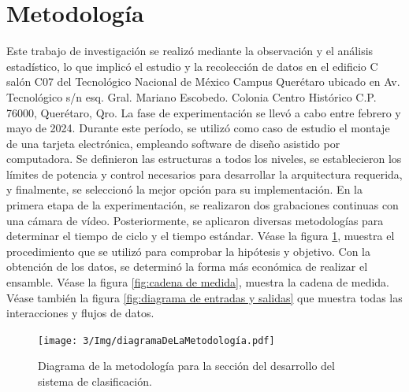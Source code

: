     \section{Metodología}
    
    Este trabajo de investigación se realizó mediante la observación y el análisis estadístico, lo que implicó el estudio y la recolección de datos en el edificio C salón C07 del Tecnológico Nacional de México Campus Querétaro ubicado en Av. Tecnológico s/n esq. Gral. Mariano Escobedo. Colonia Centro Histórico C.P. 76000, Querétaro, Qro. La fase de experimentación se llevó a cabo entre febrero y mayo de 2024. Durante este período, se utilizó como caso de estudio el montaje de una tarjeta electrónica, empleando software de diseño asistido por computadora. Se definieron las estructuras a todos los niveles, se establecieron los límites de potencia y control necesarios para desarrollar la arquitectura requerida, y finalmente, se seleccionó la mejor opción para su implementación. En la primera etapa de la experimentación, se realizaron dos grabaciones continuas con una cámara de vídeo. Posteriormente, se aplicaron diversas metodologías para determinar el tiempo de ciclo y el tiempo estándar.
    Véase la figura \ref{fig:metodología}, muestra el procedimiento que se utilizó para comprobar la hipótesis y objetivo.
    Con la obtención de los datos, se determinó la forma más económica de realizar el ensamble.
    Véase la figura \ref{fig:cadena de medida}, muestra la cadena de medida.
    Véase también la figura \ref{fig:diagrama de entradas y salidas} que muestra  todas las interacciones y flujos de datos. 
    \begin{figure}[H]
        \centering
        \texttt{[image: 3/Img/diagramaDeLaMetodología.pdf]}
        \caption{Diagrama de la metodología para la sección del desarrollo del sistema de clasificación.}
        \label{fig:metodología}
    \end{figure}
